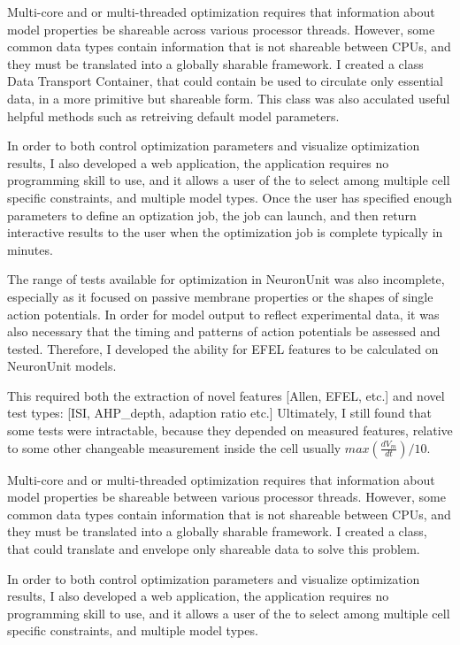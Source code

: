 Multi-core and or multi-threaded optimization requires that information about model properties be shareable across various processor threads. However, some common data types contain information that is not shareable between CPUs, and they must be translated into a globally sharable framework. I created a class Data Transport Container, that could contain be used to circulate only essential data, in a more primitive but shareable form. This class was also acculated useful helpful methods such as retreiving default model parameters.

In order to both control optimization parameters and visualize optimization results, I also developed a web application, the application requires no programming skill to use, and it allows a user of the to select among multiple cell specific constraints, and multiple model types. Once the user has specified enough parameters to define an optization job, the job can launch, and then return interactive results to the user when the optimization job is complete typically in minutes.


The range of tests available for optimization in NeuronUnit was also incomplete, especially as it focused on passive membrane properties or the shapes of single action potentials.  In order for model output to reflect experimental data, it was also necessary that the timing and patterns of action potentials be assessed and tested.  Therefore, I developed the ability for EFEL features to be calculated on NeuronUnit models. 

This required both the extraction of novel features [Allen, EFEL, etc.] and novel test types: [ISI, AHP\_depth, adaption ratio etc.] Ultimately, I still found that some tests were intractable, because they depended on measured features, relative to some other changeable measurement inside the cell usually $max(\frac{dV_{m}}{dt})/10.$

Multi-core and or multi-threaded optimization requires that information about model properties be shareable between various processor threads. However, some common data types contain information that is not shareable between CPUs, and they must be translated into a globally sharable framework. I created a class, that could translate and envelope only shareable data to solve this problem.

In order to both control optimization parameters and visualize optimization results, I also developed a web application, the application requires no programming skill to use, and it allows a user of the to select among multiple cell specific constraints, and multiple model types. 
%


